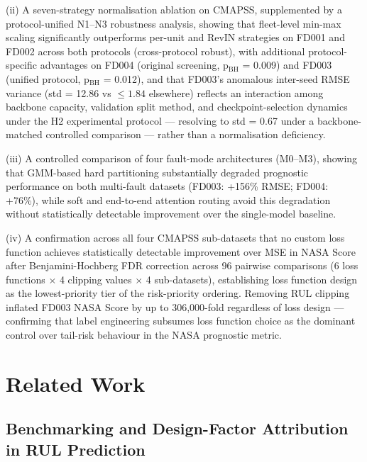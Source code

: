 \documentclass[preprint,10pt]{elsarticle}
\begin{document}
(ii) A seven-strategy normalisation ablation on CMAPSS, supplemented by a protocol-unified N1--N3 robustness analysis, showing that fleet-level min-max scaling significantly outperforms per-unit and RevIN strategies on FD001 and FD002 across both protocols (cross-protocol robust), with additional protocol-specific advantages on FD004 (original screening, p$_\text{BH}$ = 0.009) and FD003 (unified protocol, p$_\text{BH}$ = 0.012), and that FD003's anomalous inter-seed RMSE variance (std = 12.86 vs $\leq\!1.84$ elsewhere) reflects an interaction among backbone capacity, validation split method, and checkpoint-selection dynamics under the H2 experimental protocol --- resolving to std = 0.67 under a backbone-matched controlled comparison --- rather than a normalisation deficiency.

(iii) A controlled comparison of four fault-mode architectures (M0--M3), showing that GMM-based hard partitioning substantially degraded prognostic performance on both multi-fault datasets (FD003: +156\% RMSE; FD004: +76\%), while soft and end-to-end attention routing avoid this degradation without statistically detectable improvement over the single-model baseline.

(iv) A confirmation across all four CMAPSS sub-datasets that no custom loss function achieves statistically detectable improvement over MSE in NASA Score after Benjamini-Hochberg FDR correction across 96 pairwise comparisons (6 loss functions $\times$ 4 clipping values $\times$ 4 sub-datasets), establishing loss function design as the lowest-priority tier of the risk-priority ordering. Removing RUL clipping inflated FD003 NASA Score by up to 306,000-fold regardless of loss design --- confirming that label engineering subsumes loss function choice as the dominant control over tail-risk behaviour in the NASA prognostic metric.

\section{Related Work}

\subsection{Benchmarking and Design-Factor Attribution in RUL Prediction}
\end{document}
